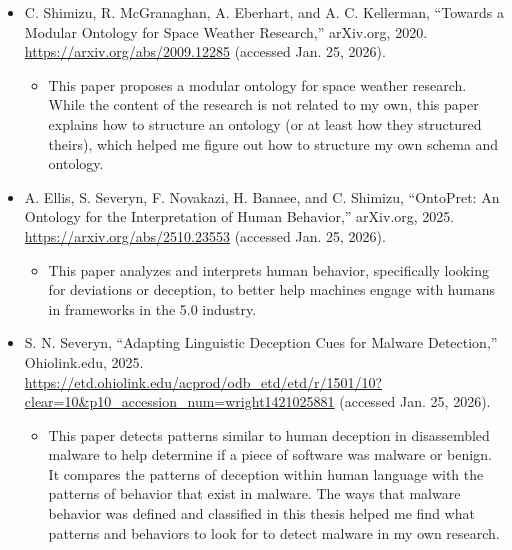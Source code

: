 \documentclass[12pt, a4paper]{article}
\begin{document}
    \begin{itemize}
        \item C. Shimizu, R. McGranaghan, A. Eberhart, and A. C. Kellerman, “Towards a Modular Ontology for Space Weather Research,” arXiv.org, 2020. 
        \url{https://arxiv.org/abs/2009.12285} (accessed Jan. 25, 2026). 
        \begin{itemize}
            \item This paper proposes a modular ontology for space weather research. While the content of the research is not related to my own, 
            this paper explains how to structure an ontology (or at least how they structured theirs), 
            which helped me figure out how to structure my own schema and ontology.
        \end{itemize}
    \end{itemize}
    \begin{itemize}
        \item A. Ellis, S. Severyn, F. Novakazi, H. Banaee, and C. Shimizu, “OntoPret: An Ontology for the Interpretation of Human Behavior,” 
        arXiv.org, 2025. \url{https://arxiv.org/abs/2510.23553} (accessed Jan. 25, 2026). 
        \begin{itemize}
            \item This paper analyzes and interprets human behavior, specifically looking for deviations or deception, 
            to better help machines engage with humans in frameworks in the 5.0 industry. 
        \end{itemize}
    \end{itemize}
    \begin{itemize}
        \item S. N. Severyn, “Adapting Linguistic Deception Cues for Malware Detection,” Ohiolink.edu, 2025. 
        \url{https://etd.ohiolink.edu/acprod/odb\_etd/etd/r/1501/10?clear=10&p10\_accession\_num=wright1421025881} (accessed Jan. 25, 2026). 
        \begin{itemize}
            \item This paper detects patterns similar to human deception in disassembled malware to help determine if a piece of software was malware or benign. 
            It compares the patterns of deception within human language with the patterns of behavior that exist in malware. 
            The ways that malware behavior was defined and classified in this thesis helped me find what patterns and behaviors to look for to detect malware
            in my own research. 
        \end{itemize}
    \end{itemize}
\end{document}
